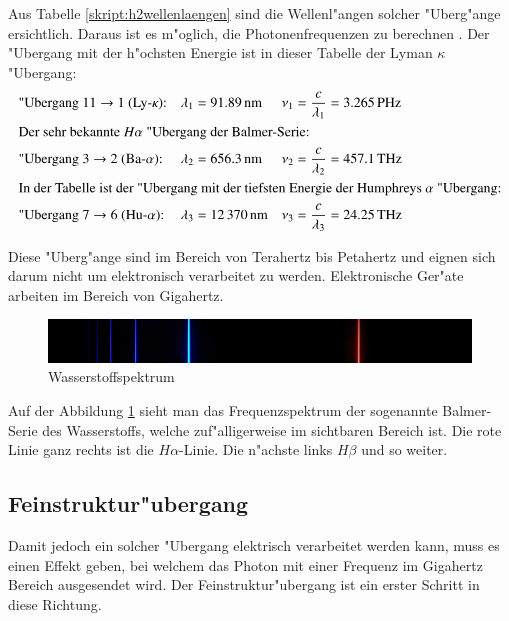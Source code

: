 \begin{refsection}
Aus Tabelle \ref{skript:h2wellenlaengen} sind die Wellenl"angen
solcher "Uberg"ange ersichtlich. Daraus ist es m"oglich, die
Photonenfrequenzen zu berechnen \cite{Gerthsen}.  Der "Ubergang mit
der h"ochsten Energie ist in dieser Tabelle der Lyman \(\kappa\)
"Ubergang:
\begin{align*}
  &\text{"Ubergang \(11 \rightarrow 1\) (Ly-\(\kappa\)):} &\lambda_1 &=
  \SI{91.89}{\nano\meter} &\nu_1 &= \dfrac{c}{\lambda_1} =
  \SI{3.265}{\peta\hertz}\\
\intertext{Der sehr bekannte \(H\alpha\) "Ubergang der Balmer-Serie:}
  &\text{"Ubergang \(3 \rightarrow 2\) (Ba-\(\alpha\)):} &\lambda_2 &=
  \SI{656.3}{\nano\meter} &\nu_2 &= \dfrac{c}{\lambda_2} =
  \SI{457.1}{\tera\hertz}\\
\intertext{In der Tabelle ist der "Ubergang mit der tiefsten Energie
  der Humphreys \(\alpha\) "Ubergang:}
  &\text{"Ubergang \(7 \rightarrow 6\) (Hu-\(\alpha\)):} &\lambda_3 &=
  \SI{12370}{\nano\meter} &\nu_3 &= \dfrac{c}{\lambda_3} =
  \SI{24.25}{\tera\hertz}
\end{align*}	

Diese "Uberg"ange sind im Bereich von Terahertz bis Petahertz und
eignen sich darum nicht um elektronisch verarbeitet zu
werden. Elektronische Ger"ate arbeiten im Bereich von Gigahertz.

\begin{figure}
	\centering
	\includegraphics[width = .6\columnwidth]{atomuhr/wasserstoffSpektrum.jpg}
	\caption{Wasserstoffspektrum \cite{pic:wasserstoffspektrum}} 
	\label{atomuhr:wasserstoffspektrum}
\end{figure}

Auf der Abbildung \ref{atomuhr:wasserstoffspektrum} sieht man das
Frequenzspektrum der sogenannte Balmer-Serie des Wasserstoffs, welche
zuf"alligerweise im sichtbaren Bereich ist. Die rote Linie ganz rechts
ist die $H\alpha$-Linie. Die n"achste links $H\beta$ und so weiter.


\subsection{Feinstruktur"ubergang}
Damit jedoch ein solcher "Ubergang elektrisch verarbeitet werden kann,
muss es einen Effekt geben, bei welchem das Photon mit einer Frequenz
im Gigahertz Bereich ausgesendet wird.  Der Feinstruktur"ubergang ist
ein erster Schritt in diese Richtung.
%


\end{refsection}
